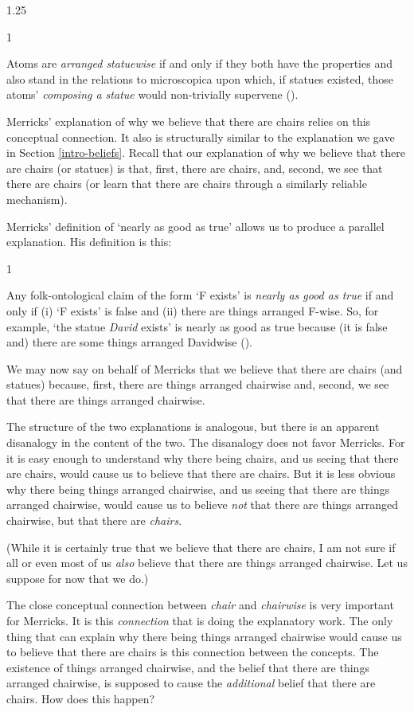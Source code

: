 \documentclass[12pt,twoside]{reedfancy}
\newenvironment{squote}{%
	\begin{spacing}{1}
	\begin{list}{}{%
	\setlength{\labelwidth}{0pt}%
	\rightmargin\leftmargin%
	}
	\item\relax
	}{%
	\end{list}%
	\end{spacing}
	}
\begin{document}
\begin{spacing}{1.25}
\begin{squote}
Atoms are \emph{arranged statuewise} if and only if they both have the
properties and also stand in the relations to microscopica upon which,
if statues existed, those atoms' \emph{composing a statue} would
non-trivially supervene (\citeyear[4]{merricks2001a}).
\end{squote}

Merricks' explanation of why we believe that there are chairs relies
on this conceptual connection.  It also is structurally similar to the
explanation we gave in Section \ref{intro-beliefs}.  Recall that our
explanation of why we believe that there are chairs (or statues) is
that, first, there are chairs, and, second, we see that there are
chairs (or learn that there are chairs through a similarly reliable
mechanism).

Merricks' definition of `nearly as good as true' allows us to produce
a parallel explanation.  His definition is this:

\begin{squote}
Any folk-ontological claim of the form `F exists' is \emph{nearly as
  good as true} if and only if (i) `F exists' is false and (ii) there
are things arranged F-wise. So, for example, `the statue \emph{David}
exists' is nearly as good as true because (it is false and) there are
some things arranged Davidwise (\citeyear[171]{merricks2001a}).
\end{squote}

We may now say on behalf of Merricks that we believe that there are
chairs (and statues) because, first, there are things arranged
chairwise and, second, we see that there are things arranged
chairwise.

The structure of the two explanations is analogous, but there is an
apparent disanalogy in the content of the two.  The disanalogy does
not favor Merricks.  For it is easy enough to understand why there
being chairs, and us seeing that there are chairs, would cause us to
believe that there are chairs.  But it is less obvious why there being
things arranged chairwise, and us seeing that there are things
arranged chairwise, would cause us to believe {\em not} that there are
things arranged chairwise, but that there are {\em chairs}.

(While it is certainly true that we believe that there are chairs, I
am not sure if all or even most of us {\em also} believe that there
are things arranged chairwise.  Let us suppose for now that we do.)

The close conceptual connection between {\em chair} and {\em
  chairwise} is very important for Merricks.  It is this {\em
  connection} that is doing the explanatory work.  The only thing that
can explain why there being things arranged chairwise would cause us
to believe that there are chairs is this connection between the
concepts.  The existence of things arranged chairwise, and the belief
that there are things arranged chairwise, is supposed to cause the
{\em additional} belief that there are chairs.  How does this happen?


\end{spacing}
\end{document}
